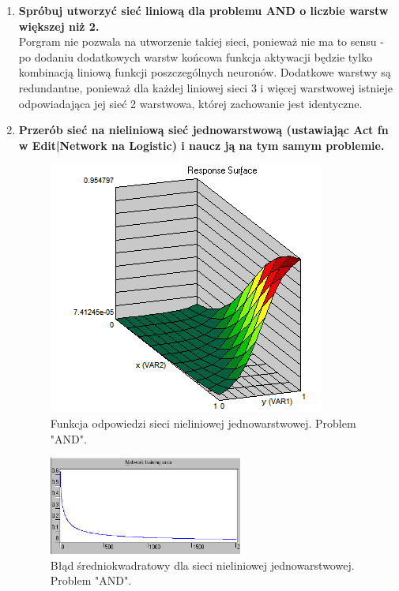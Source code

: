 \begin{enumerate}
\item \textbf{
Spróbuj utworzyć sieć liniową dla problemu AND o liczbie warstw większej niż 2.}
\\Porgram nie pozwala na utworzenie takiej sieci, ponieważ nie ma to sensu - po dodaniu dodatkowych warstw końcowa funkcja aktywacji będzie tylko kombinacją liniową funkcji poszczególnych neuronów. Dodatkowe warstwy są redundantne, ponieważ dla każdej liniowej sieci 3 i więcej warstwowej istnieje odpowiadająca jej sieć 2 warstwowa, której zachowanie jest identyczne.

\item \textbf{
Przerób sieć na nieliniową sieć jednowarstwową (ustawiając Act fn w Edit|Network na Logistic) i naucz ją na tym samym problemie.}

\begin{figure}[h]
\centering
\includegraphics[scale=1.0]{dane/part1/zad2/response_nonlinear}
\caption{Funkcja odpowiedzi sieci nieliniowej jednowarstwowej. Problem "AND".\label{fig:response_nonlinear}}
\end{figure}

\begin{figure}[h]
\centering
\includegraphics[width=0.6\textwidth]{dane/part1/zad2/error_nonlinear}
\caption{Błąd średniokwadratowy dla sieci nieliniowej jednowarstwowej. Problem "AND".\label{fig:error_nonlinear}}
\end{figure}


\end{enumerate}
